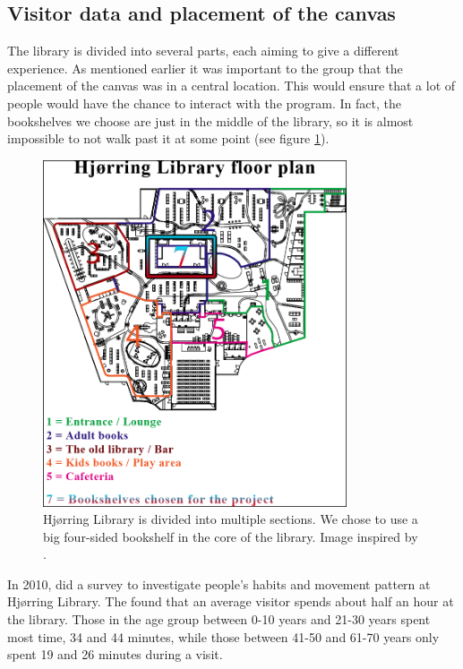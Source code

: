 \subsection{Visitor data and placement of the canvas}
The library is divided into several parts, each aiming to give a different experience. As mentioned earlier it was important to the group that the placement of the canvas was in a central location. This would ensure that a lot of people would have the chance to interact with the program. In fact, the bookshelves we choose are just in the middle of the library, so it is almost impossible to not walk past it at some point (see figure \ref{fig:library_floorplans}).

\begin{figure}[htbp]
\centering
\includegraphics[width=0.80\textwidth]{Pictures/HjoerringLibrary/hjoerring_library_floorplans.png}
\caption{Hj{\o}rring Library is divided into multiple sections. We chose to use a big four-sided bookshelf in the core of the library. Image inspired by \citep{hjoerring_study}.}
\label{fig:library_floorplans}
\end{figure}

In 2010, \citep{hjoerring_study} did a survey to investigate people's habits and movement pattern at Hj{\o}rring Library. The found that an average visitor spends about half an hour at the library. Those in the age group between 0-10 years and 21-30 years spent most time, 34 and 44 minutes, while those between 41-50 and 61-70 years only spent 19 and 26 minutes during a visit.

